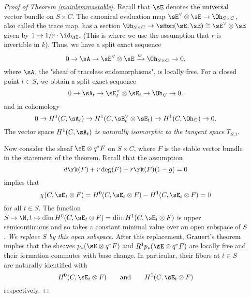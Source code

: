 \begin{proof}[Proof of Theorem \ref{mainlemmastable}]
Recall that $\sE$ denotes the universal vector bundle on $S \times C$. The canonical evaluation map $\sE^\vee \otimes \sE \to \Oh_{S \times C}$, also called the trace map, has a section $\Oh_{S \times C} \to \sHom(\sE, \sE) \cong \sE^\vee \otimes \sE$ given by $1 \mapsto 1/r \cdot \id_{\sE}$. (This is where we use the assumption that $r$ is invertible in $k$). Thus, we have a split exact sequence
\[ 0 \to \sA \to \sE^\vee \otimes \sE \xrightarrow{\mathrm{tr}} \Oh_{S \times C} \to 0, \]
where $\sA$, the "sheaf of traceless endomorphisms", is locally free. For a closed point $t \in S$, we obtain a split exact sequence
\[ 0 \to \sA_t \to \sE_t^\vee \otimes \sE_t \to \Oh_C \to 0, \]
and in cohomology
\begin{equation} \label{H1exact}
    0 \to H^1(C, \sA_t) \to H^1(C, \sE_t^\vee \otimes \sE_t) \to H^1(C, \Oh_C) \to 0.
\end{equation}
The vector space $H^1(C, \sA_t)$ \emph{is naturally isomorphic to the tangent space} $T_{S,t}$.

Now consider the sheaf $\sE \otimes q^*F$ on $S \times C$, where $F$ is the stable vector bundle in the statement of the theorem. Recall that the assumption
\[ d \rk(F) + r \deg(F) + r \rk(F) (1-g) = 0 \]
implies that 
\[ \chi(C, \sE_t \otimes F) = H^0(C, \sE_t \otimes F) - H^1(C, \sE_t \otimes F) = 0 \] 
for all $t \in S$. The function $S \to \N, t \mapsto \dim H^0(C, \sE_t \otimes F) = \dim H^1(C, \sE_t \otimes F)$ is upper semicontinuous and so takes a constant minimal value over an open subspace of $S$. \emph{We replace $S$ by this open subspace.} After this replacement, Grauert's theorem implies that the sheaves $p_*(\sE \otimes q^*F)$ and $R^1 p_*(\sE \otimes q^*F)$ are locally free and their formation commutes with base change. In particular, their fibers at $t \in S$ are naturally identified with 
\[ H^0(C, \sE_t \otimes F) \qquad \mathrm{and} \qquad H^1(C, \sE_t \otimes F) \] respectively.


\end{proof}
